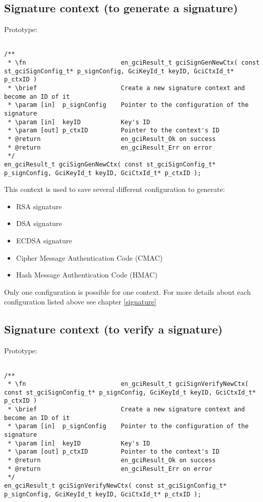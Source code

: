 \subsection{Signature context (to generate a signature) }

Prototype:
\begin{lstlisting}

/**
 * \fn							en_gciResult_t gciSignGenNewCtx( const st_gciSignConfig_t* p_signConfig, GciKeyId_t keyID, GciCtxId_t* p_ctxID )
 * \brief						Create a new signature context and become an ID of it
 * \param [in]  p_signConfig	Pointer to the configuration of the signature
 * \param [in]  keyID			Key's ID
 * \param [out] p_ctxID			Pointer to the context's ID
 * @return						en_gciResult_Ok on success
 * @return						en_gciResult_Err on error
 */
en_gciResult_t gciSignGenNewCtx( const st_gciSignConfig_t* p_signConfig, GciKeyId_t keyID, GciCtxId_t* p_ctxID );

\end{lstlisting}

This context is used to save several different configuration to generate:
\begin{itemize}
  \item RSA signature
  \item DSA signature
  \item ECDSA signature
  \item Cipher Message Authentication Code (CMAC)
  \item Hash Message Authentication Code (HMAC)
\end{itemize}

Only one configuration is possible for one context. 
\newline
For more details about each configuration listed above see chapter
\ref{signature}




\subsection{Signature context (to verify a signature)}

Prototype:
\begin{lstlisting}

/**
 * \fn							en_gciResult_t gciSignVerifyNewCtx( const st_gciSignConfig_t* p_signConfig, GciKeyId_t keyID, GciCtxId_t* p_ctxID )
 * \brief						Create a new signature context and become an ID of it
 * \param [in]  p_signConfig	Pointer to the configuration of the signature
 * \param [in]  keyID			Key's ID
 * \param [out] p_ctxID			Pointer to the context's ID
 * @return						en_gciResult_Ok on success
 * @return						en_gciResult_Err on error
 */
en_gciResult_t gciSignVerifyNewCtx( const st_gciSignConfig_t* p_signConfig, GciKeyId_t keyID, GciCtxId_t* p_ctxID );

\end{lstlisting}

